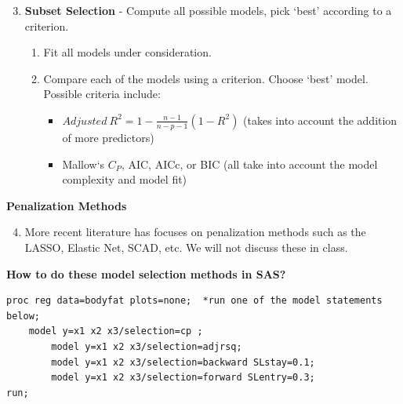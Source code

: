 \begin{enumerate}\setcounter{enumi}{2}
\item \textbf{Subset Selection} - Compute all possible models, pick `best' according to a criterion.
\begin{enumerate}
		\item Fit all models under consideration.
		\item Compare each of the models using a criterion.  Choose `best' model.\\
Possible criteria include:
		\begin{itemize}
			\item $Adjusted~R^2 = 1-\frac{n-1}{n-p-1}(1-R^2)$ (takes into account the addition of more predictors)
			\item Mallow`s $C_P$, AIC, AICc, or BIC (all take into account the model complexity and model fit)
		\end{itemize}
	\end{enumerate}
\end{enumerate}
\textbf{Penalization Methods}
\begin{enumerate}\setcounter{enumi}{3}
\item More recent literature has focuses on penalization methods such as the LASSO, Elastic Net, SCAD, etc.  We will not discuss these in class.
\end{enumerate}

\newpage

\textbf{How to do these model selection methods in SAS?}
\begin{small}
\begin{verbatim}
proc reg data=bodyfat plots=none;  *run one of the model statements below;
    model y=x1 x2 x3/selection=cp ;                   
		model y=x1 x2 x3/selection=adjrsq; 
		model y=x1 x2 x3/selection=backward SLstay=0.1;  	   					
		model y=x1 x2 x3/selection=forward SLentry=0.3;   
run;
\end{verbatim}
\end{small}

